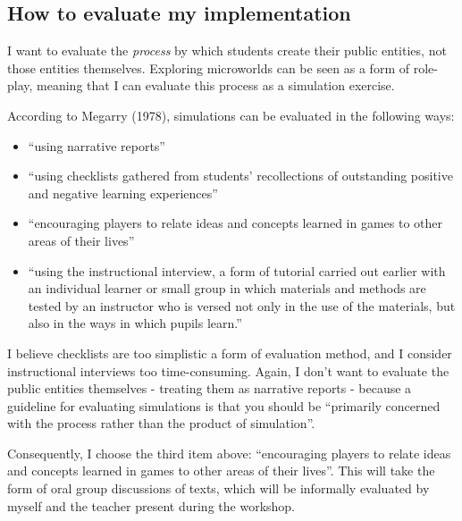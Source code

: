 \subsection{How to evaluate my implementation}

 I want to evaluate the \textit{process} by which students create their public entities, not those entities themselves. Exploring microworlds can be seen as a form of role-play, meaning that I can evaluate this process as a simulation exercise.

 According to Megarry (1978)\cite[p187-207]{megarry}, simulations can be evaluated in the following ways:

\begin{itemize} 
  \item ``using narrative reports''
  \item ``using checklists gathered from students' recollections of outstanding positive and negative learning experiences''
  \item ``encouraging players to relate ideas and concepts learned in games to other areas of their lives''
  \item ``using the instructional interview, a form of tutorial carried out earlier with an individual learner or small group in which materials and methods are tested by an instructor who is versed not only in the use of the materials, but also in the ways in which pupils learn.''
\end{itemize}

I believe checklists are too simplistic a form of evaluation method, and I consider instructional interviews too time-consuming. Again, I don't want to evaluate the public entities themselves - treating them as narrative reports - because a guideline for evaluating simulations is that you should be ``primarily concerned with the process rather than the product of simulation''\cite{lindabook}.

Consequently, I choose the third item above: ``encouraging players to relate ideas and concepts learned in games to other areas of their lives''. This will take the form of oral group discussions of texts, which will be informally evaluated by myself and the teacher present during the workshop.
